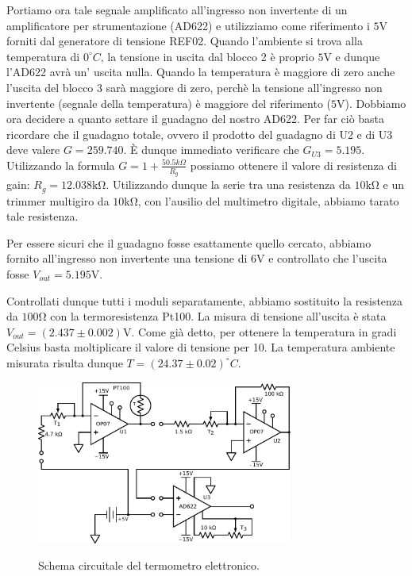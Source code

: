 Portiamo ora tale segnale amplificato all'ingresso non invertente di un amplificatore per strumentazione (AD622) e utilizziamo come riferimento i $5\si{\volt}$ forniti dal generatore di tensione REF02.
Quando l'ambiente si trova alla temperatura di $0^{\circ}C$, la tensione in uscita dal blocco 2 è proprio $5\si{\volt}$ e dunque l'AD622 avrà un' uscita nulla.
Quando la temperatura è maggiore di zero anche l'uscita del blocco 3 sarà maggiore di zero, perchè la tensione all'ingresso non invertente (segnale della temperatura) è maggiore del riferimento ($5\si{\volt}$).
Dobbiamo ora decidere a quanto settare il guadagno del nostro AD622.
Per far ciò basta ricordare che il guadagno totale, ovvero il prodotto del guadagno di U2 e di U3 deve valere $G=259.740$.
È dunque immediato verificare che $G_{U3}=5.195$.
Utilizzando la formula $G=1+\frac{50.5k\Omega}{R_g}$ possiamo ottenere il valore di resistenza di gain: $R_g=12.038\si{\kilo\ohm}$.
Utilizzando dunque la serie tra una resistenza da $10\si{\kilo\ohm}$ e un trimmer multigiro da $10\si{\kilo\ohm}$, con l'ausilio del multimetro digitale, abbiamo tarato tale resistenza. 

Per essere sicuri che il guadagno fosse esattamente quello cercato, abbiamo fornito all'ingresso non invertente una tensione di $6\si{\volt}$ e controllato che l'uscita fosse $V_{out}=5.195 \si{\volt}$. 

Controllati dunque tutti i moduli separatamente, abbiamo sostituito la resistenza da $100\si{\ohm}$ con la termoresistenza Pt100.
La misura di tensione all'uscita è stata $V_{out}=(2.437\pm 0.002)\si{\volt}$.
Come già detto, per ottenere la temperatura in gradi Celsius basta moltiplicare il valore di tensione per 10.
La temperatura ambiente misurata risulta dunque $T=(24.37\pm0.02)^{\circ}C$.

\begin{figure}[ht]
 \centering
   {\includegraphics[width=0.75\textwidth]{../E06/latex/c1.pdf}}
 \caption{Schema circuitale del termometro elettronico.}
 \label{gr5:sbil_amp_diff}
\end{figure}
